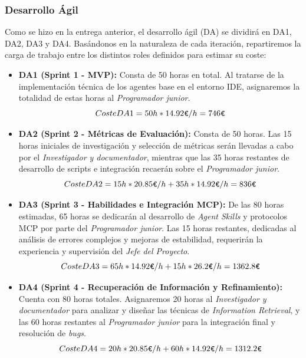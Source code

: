 \documentclass[11pt, letterpaper]{article}
\begin{document}
\subsubsection{Desarrollo Ágil}
Como se hizo en la entrega anterior, el desarrollo ágil (DA) se dividirá en DA1, DA2, DA3 y DA4. Basándonos en la naturaleza de cada iteración, repartiremos la carga de trabajo entre los distintos roles definidos para estimar su coste:

\begin{itemize}
    \item \textbf{DA1 (Sprint 1 - MVP):} Consta de 50 horas en total. Al tratarse de la implementación técnica de los agentes base en el entorno IDE, asignaremos la totalidad de estas horas al \textit{Programador junior}.
    \begin{equation*}
        Coste DA1 = 50h * 14{.}92\verb|€|/h = 746\verb|€|
    \end{equation*}
    
    \item \textbf{DA2 (Sprint 2 - Métricas de Evaluación):} Consta de 50 horas. Las 15 horas iniciales de investigación y selección de métricas serán llevadas a cabo por el \textit{Investigador y documentador}, mientras que las 35 horas restantes de desarrollo de scripts e integración recaerán sobre el \textit{Programador junior}.
    \begin{equation*}
        Coste DA2 = 15h * 20{.}85\verb|€|/h + 35h * 14{.}92\verb|€|/h = 836\verb|€|
    \end{equation*}
    
    \item \textbf{DA3 (Sprint 3 - Habilidades e Integración MCP):} De las 80 horas estimadas, 65 horas se dedicarán al desarrollo de \textit{Agent Skills} y protocolos MCP por parte del \textit{Programador junior}. Las 15 horas restantes, dedicadas al análisis de errores complejos y mejoras de estabilidad, requerirán la experiencia y supervisión del \textit{Jefe del Proyecto}.
    \begin{equation*}
        Coste DA3 = 65h * 14{.}92\verb|€|/h + 15h * 26{.}2\verb|€|/h = 1362{.}8\verb|€|
    \end{equation*}
    
    \item \textbf{DA4 (Sprint 4 - Recuperación de Información y Refinamiento):} Cuenta con 80 horas totales. Asignaremos 20 horas al \textit{Investigador y documentador} para analizar y diseñar las técnicas de \textit{Information Retrieval}, y las 60 horas restantes al \textit{Programador junior} para la integración final y resolución de \textit{bugs}.
    \begin{equation*}
        Coste DA4 = 20h * 20{.}85\verb|€|/h + 60h * 14{.}92\verb|€|/h = 1312{.}2\verb|€|
    \end{equation*}
\end{itemize}
\end{document}
